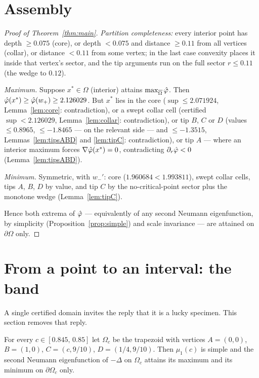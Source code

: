 \documentclass[11pt]{article}
\begin{document}
\section{Assembly}\label{sec:assembly}

\begin{proof}[Proof of Theorem~\ref{thm:main}]
\emph{Partition completeness:} every interior point has depth
$\ge0.075$ (core), or depth $<0.075$ and distance $\ge0.11$ from all
vertices (collar), or distance $<0.11$ from some vertex; in the last
case convexity places it inside that vertex's sector, and the tip
arguments run on the full sector $r\le0.11$ (the wedge to $0.12$).

\emph{Maximum.} Suppose $x^*\in\Omega$ (interior) attains
$\max_{\overline\Omega}\hat\varphi$. Then
$\hat\varphi(x^*)\ge\hat\varphi(w_+)\ge2.126029$. But $x^*$ lies in the core
($\sup\le2.071924$, Lemma~\ref{lem:core}: contradiction), or a swept
collar cell (certified $\sup<2.126029$, Lemma~\ref{lem:collar}:
contradiction), or tip $B$, $C$ or $D$ (values $\le0.8965$, $\le-1.8465$
--- on the relevant side --- and $\le-1.3515$, Lemmas~\ref{lem:tipsABD}
and \ref{lem:tipC}: contradiction), or tip $A$ --- where an interior
maximum forces $\nabla\hat\varphi(x^*)=0$, contradicting
$\partial_r\hat\varphi<0$ (Lemma~\ref{lem:tipsABD}).

\emph{Minimum.} Symmetric, with $w_-'$: core
($1.960684<1.993811$), swept collar cells, tips $A$, $B$, $D$ by value,
and tip $C$ by the no-critical-point sector plus the monotone wedge
(Lemma~\ref{lem:tipC}).

Hence both extrema of $\hat\varphi$ --- equivalently of any second Neumann
eigenfunction, by simplicity (Proposition~\ref{prop:simple}) and scale
invariance --- are attained on $\partial\Omega$ only.
\end{proof}

\section{From a point to an interval: the band}\label{sec:band}

A single certified domain invites the reply that it is a lucky specimen.
This section removes that reply.

\begin{theorem}\label{thm:band}
For every $c\in[0.845,\,0.85]$ let $\Omega_c$ be the trapezoid with
vertices $A=(0,0)$, $B=(1,0)$, $C=(c,9/10)$, $D=(1/4,9/10)$. Then
$\mu_1(c)$ is simple and the second Neumann eigenfunction of $-\Delta$
on $\Omega_c$ attains its maximum and its minimum on $\partial\Omega_c$
only.
\end{theorem}
\end{document}
